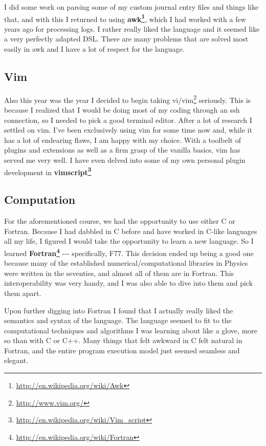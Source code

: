 \documentclass[]{article}
\renewcommand{\href}[2]{#2\footnote{\url{#1}}}
\begin{document}
I did some work on parsing some of my custom journal entry files and things like
that, and with this I returned to using
\textbf{\href{http://en.wikipedia.org/wiki/Awk}{awk}}, which I had worked with a
few years ago for processing logs. I rather really liked the language and it
seemed like a very perfectly adapted DSL. There are many problems that are
solved most easily in awk and I have a lot of respect for the language.

\subsection{Vim}

Also this year was the year I decided to begin taking
vi/\href{http://www.vim.org/}{vim} seriously. This is because I realized that I
would be doing most of my coding through an ssh connection, so I needed to pick
a good terminal editor. After a lot of research I settled on vim. I've been
exclusively using vim for some time now and, while it has a lot of endearing
flaws, I am happy with my choice. With a toolbelt of plugins and extensions as
well as a firm grasp of the vanilla basics, vim has served me very well. I have
even delved into some of my own personal plugin development in
\textbf{\href{http://en.wikipedia.org/wiki/Vim_script}{vimscript}}

\subsection{Computation}

For the aforementioned course, we had the opportunity to use either C or
Fortran. Because I had dabbled in C before and have worked in C-like languages
all my life, I figured I would take the opportunity to learn a new language. So
I learned \textbf{\href{http://en.wikipedia.org/wiki/Fortran}{Fortran}} -\/-\/-
specifically, F77. This decision ended up being a good one because many of the
established numerical/computational libraries in Physics were written in the
seventies, and almost all of them are in Fortran. This interoperability was very
handy, and I was also able to dive into them and pick them apart.

Upon further digging into Fortran I found that I actually really liked the
semantics and syntax of the language. The language seemed to fit to the
computational techniques and algorithms I was learning about like a glove, more
so than with C or C++. Many things that felt awkward in C felt natural in
Fortran, and the entire program execution model just seemed seamless and
elegant.
\end{document}
